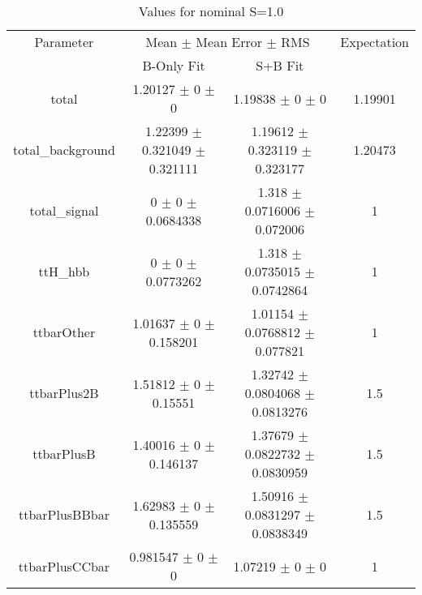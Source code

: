 \begin{table}
\centering
\caption{Values for nominal S=1.0}
\begin{tabular}{cccc}
\toprule
Parameter & \multicolumn{2}{c}{Mean $\pm$ Mean Error $\pm$ RMS} & Expectation\\
 & B-Only Fit & S+B Fit & \\
\midrule
total & \num{1.20127} $\pm$ \num{0} $\pm$ \num{0} & \num{1.19838} $\pm$ \num{0} $\pm$ \num{0} & \num{1.19901}\\
total\_background & \num{1.22399} $\pm$ \num{0.321049} $\pm$ \num{0.321111} & \num{1.19612} $\pm$ \num{0.323119} $\pm$ \num{0.323177} & \num{1.20473}\\
total\_signal & \num{0} $\pm$ \num{0} $\pm$ \num{0.0684338} & \num{1.318} $\pm$ \num{0.0716006} $\pm$ \num{0.072006} & \num{1}\\
ttH\_hbb & \num{0} $\pm$ \num{0} $\pm$ \num{0.0773262} & \num{1.318} $\pm$ \num{0.0735015} $\pm$ \num{0.0742864} & \num{1}\\
ttbarOther & \num{1.01637} $\pm$ \num{0} $\pm$ \num{0.158201} & \num{1.01154} $\pm$ \num{0.0768812} $\pm$ \num{0.077821} & \num{1}\\
ttbarPlus2B & \num{1.51812} $\pm$ \num{0} $\pm$ \num{0.15551} & \num{1.32742} $\pm$ \num{0.0804068} $\pm$ \num{0.0813276} & \num{1.5}\\
ttbarPlusB & \num{1.40016} $\pm$ \num{0} $\pm$ \num{0.146137} & \num{1.37679} $\pm$ \num{0.0822732} $\pm$ \num{0.0830959} & \num{1.5}\\
ttbarPlusBBbar & \num{1.62983} $\pm$ \num{0} $\pm$ \num{0.135559} & \num{1.50916} $\pm$ \num{0.0831297} $\pm$ \num{0.0838349} & \num{1.5}\\
ttbarPlusCCbar & \num{0.981547} $\pm$ \num{0} $\pm$ \num{0} & \num{1.07219} $\pm$ \num{0} $\pm$ \num{0} & \num{1}\\
\bottomrule
\end{tabular}
\end{table}